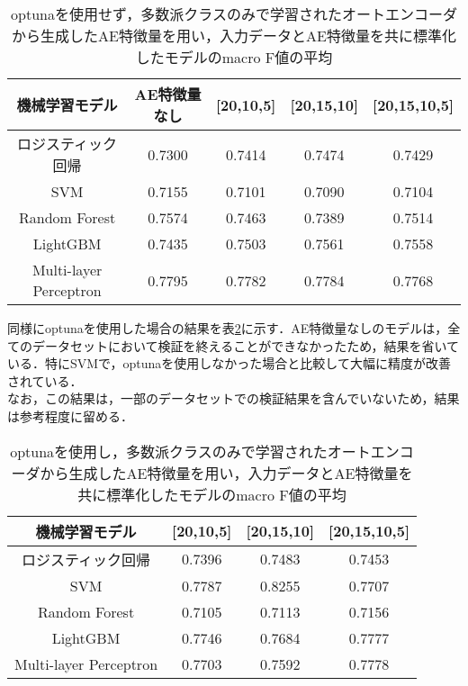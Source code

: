 \begin{table}[htbp]
    \caption{optunaを使用せず，多数派クラスのみで学習されたオートエンコーダから生成したAE特徴量を用い，入力データとAE特徴量を共に標準化したモデルのmacro F値の平均}
    \label{tab:compare-model-aes-majority}
    \centering
    \begin{tabular}{ccccc}
        \hline
        機械学習モデル& AE特徴量なし & [20,10,5] & [20,15,10]& [20,15,10,5] \\ 
        \hline
        ロジスティック回帰  & 0.7300& 0.7414&  0.7474& 0.7429\\
        SVM & 0.7155& 0.7101& 0.7090& 0.7104\\
        Random Forest & 0.7574& 0.7463& 0.7389&  0.7514\\
        LightGBM & 0.7435& 0.7503& 0.7561& 0.7558\\
        Multi-layer Perceptron & 0.7795& 0.7782&  0.7784& 0.7768\\
        \hline
    \end{tabular}
\end{table}

同様にoptunaを使用した場合の結果を表\ref{tab:compare-model-aes-majority-optuna}に示す．AE特徴量なしのモデルは，全てのデータセットにおいて検証を終えることができなかったため，結果を省いている．特にSVMで，optunaを使用しなかった場合と比較して大幅に精度が改善されている．\\
なお，この結果は，一部のデータセットでの検証結果を含んでいないため，結果は参考程度に留める．
\begin{table}[htbp]
    \caption{optunaを使用し，多数派クラスのみで学習されたオートエンコーダから生成したAE特徴量を用い，入力データとAE特徴量を共に標準化したモデルのmacro F値の平均}
    \label{tab:compare-model-aes-majority-optuna}
    \centering
    \begin{tabular}{cccc}
        \hline
        機械学習モデル& [20,10,5] & [20,15,10]& [20,15,10,5] \\ 
        \hline
        ロジスティック回帰  & 0.7396& 0.7483&  0.7453\\
        SVM & 0.7787& 0.8255& 0.7707\\
        Random Forest & 0.7105& 0.7113& 0.7156\\
        LightGBM & 0.7746& 0.7684& 0.7777\\
        Multi-layer Perceptron & 0.7703& 0.7592&  0.7778\\
        \hline
    \end{tabular}
\end{table}